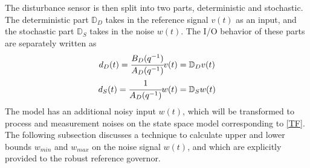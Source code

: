 \documentclass[letterpaper, 10 pt, conference]{ieeeconf}  %
\begin{document}
\begin{enumerate}
	The disturbance sensor is then split into two parts, deterministic and stochastic. The deterministic part $\mathbb{D}_D$ takes in the reference signal $v(t)$ as an input, and the stochastic part $\mathbb{D}_S$ takes in the noise $w(t)$. The I/O behavior of these parts are separately written as 
	\begin{equation*}
	\begin{matrix}
	d_D(t) = \cfrac{B_D(q^{-1})}{A_D(q^{-1})}v(t) = \mathbb{D}_D v(t) \vspace{4pt} \\  
	d_S(t) = \cfrac{1}{A_D(q^{-1})}w(t) = \mathbb{D}_S w(t)
	\end{matrix}
	\end{equation*}
	The model has an additional noisy input $w(t)$, which will be transformed to process and measurement noises on the state space model corresponding to \eqref{TF}. The following subsection discusses a technique to calculate upper and lower bounds $w_{min}$ and $w_{max}$ on the noise signal $w(t)$, and which are explicitly provided to the robust reference governor.

\end{enumerate}
\end{document}
